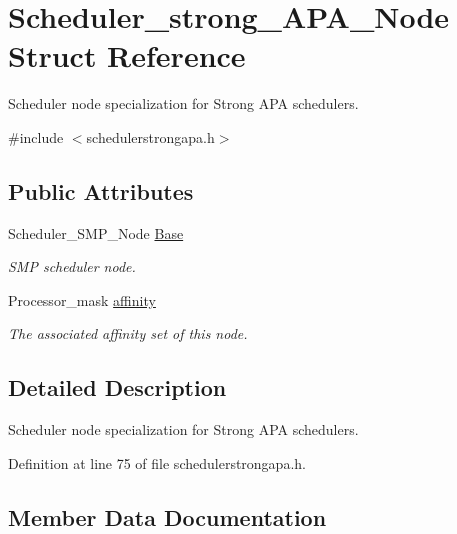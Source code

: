 \hypertarget{structScheduler__strong__APA__Node}{}\section{Scheduler\+\_\+strong\+\_\+\+A\+P\+A\+\_\+\+Node Struct Reference}
\label{structScheduler__strong__APA__Node}


Scheduler node specialization for Strong A\+PA schedulers.  




{\ttfamily \#include $<$schedulerstrongapa.\+h$>$}

\subsection*{Public Attributes}
\begin{DoxyCompactItemize}
\item 
Scheduler\+\_\+\+S\+M\+P\+\_\+\+Node \hyperlink{structScheduler__strong__APA__Node_ae86cbf5fd8743267abe33bed6d8b0fe6}{Base}
\begin{DoxyCompactList}\small\item\em S\+MP scheduler node. \end{DoxyCompactList}\item 
Processor\+\_\+mask \hyperlink{structScheduler__strong__APA__Node_a2e8928b11f1738a11c228780eb849989}{affinity}
\begin{DoxyCompactList}\small\item\em The associated affinity set of this node. \end{DoxyCompactList}\end{DoxyCompactItemize}


\subsection{Detailed Description}
Scheduler node specialization for Strong A\+PA schedulers. 

Definition at line 75 of file schedulerstrongapa.\+h.



\subsection{Member Data Documentation}
\mbox{\label{structScheduler__strong__APA__Node_a2e8928b11f1738a11c228780eb849989}} 
